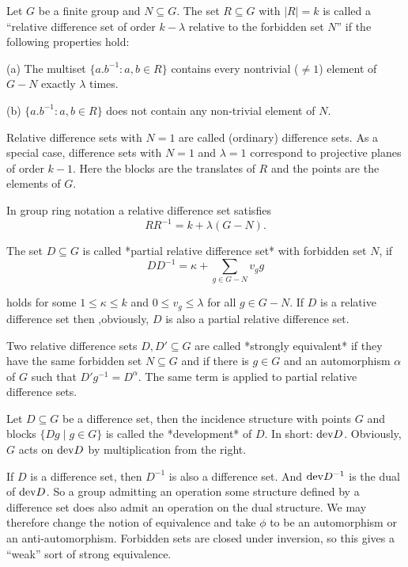 Let $G$ be a finite group and $N\subseteq G$. The set $R\subseteq G$
with $|R|=k$ is called a ``relative difference set of order
$k-\lambda$ relative to the forbidden set $N$'' if the following
properties hold:

\beginlist%
\item{(a)} The multiset $\{ a.b^{-1}\colon a,b\in R\}$ contains
  every nontrivial ($\neq 1$) element of $G-N$ exactly $\lambda$
  times.  
\item{(b)} $\{ a.b^{-1}\colon a,b\in R\}$ does not contain
  any non-trivial element of $N$.
\endlist

Relative difference sets with $N=1$ are called (ordinary) difference
sets. As a special case, difference sets with $N=1$ and $\lambda=1$
correspond to projective planes of order $k-1$.  Here the blocks are
the translates of $R$ and the points are the elements of $G$.

In group ring notation a relative difference set satisfies
$$
RR^{-1}=k+\lambda(G-N).
$$

The set $D\subseteq G$ is called *partial relative difference set*
with forbidden set $N$, if
$$
    DD^{-1}=\kappa+\sum_{g\in G-N}v_gg   
$$ 

holds for some $1\leq\kappa\leq k$ and $0\leq v_g \leq \lambda$ for
all $g\in G-N$.  If $D$ is a relative difference set then ,obviously,
$D$ is also a partial relative difference set.

Two relative difference sets $D,D'\subseteq G$ are called *strongly
equivalent* if they have the same forbidden set $N\subseteq G$ and if
there is $g\in G$ and an automorphism $\alpha$ of $G$ such that
$D'g^{-1}=D^\alpha$. The same term is applied to partial relative
difference sets.

Let $D\subseteq G$ be a difference set, then the incidence structure
with points $G$ and blocks $\{Dg\;|\;g\in G\}$ is called the
*development* of $D$. In short:  ${\rm dev} D$. Obviously, $G$ acts on
${\rm dev}D$ by multiplication from the right.

If $D$ is a difference set, then $D^{-1}$ is also a difference set.
And ${\rm dev} D^{-1}$ is the dual of ${\rm dev} D$. So a group
admitting an operation some structure defined by a difference set does
also admit an operation on the dual structure. We may therefore change
the notion of equivalence and take $\phi$ to be an automorphism or an
anti-automorphism. Forbidden sets are closed under inversion, so this
gives a ``weak'' sort of strong equivalence.



